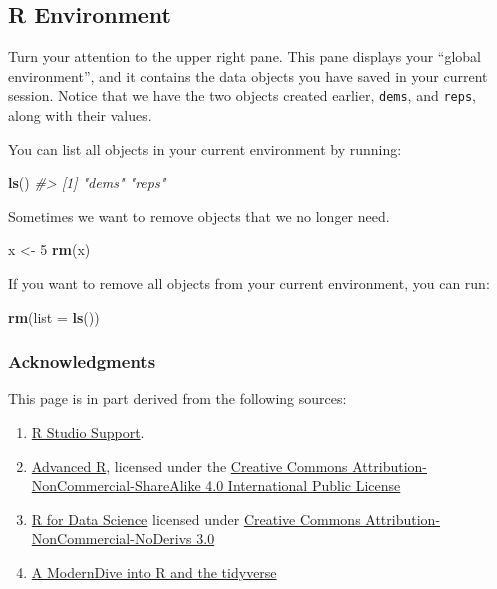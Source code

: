 \documentclass[]{book}
\newenvironment{Shaded}{\begin{snugshade}}{\end{snugshade}}
\newcommand{\KeywordTok}[1]{\textcolor[rgb]{0.13,0.29,0.53}{\textbf{#1}}}
\newcommand{\DataTypeTok}[1]{\textcolor[rgb]{0.13,0.29,0.53}{#1}}
\newcommand{\DecValTok}[1]{\textcolor[rgb]{0.00,0.00,0.81}{#1}}
\newcommand{\StringTok}[1]{\textcolor[rgb]{0.31,0.60,0.02}{#1}}
\newcommand{\CommentTok}[1]{\textcolor[rgb]{0.56,0.35,0.01}{\textit{#1}}}
\newcommand{\NormalTok}[1]{#1}
\begin{document}
\subsection{R Environment}\label{r-environment}

Turn your attention to the upper right pane. This pane displays your
``global environment'', and it contains the data objects you have saved
in your current session. Notice that we have the two objects created
earlier, \texttt{dems}, and \texttt{reps}, along with their values.

You can list all objects in your current environment by running:

\begin{Shaded}
\begin{Highlighting}[]
\KeywordTok{ls}\NormalTok{()}
\CommentTok{#> [1] "dems" "reps"}
\end{Highlighting}
\end{Shaded}

Sometimes we want to remove objects that we no longer need.

\begin{Shaded}
\begin{Highlighting}[]
\NormalTok{x <-}\StringTok{ }\DecValTok{5}
\KeywordTok{rm}\NormalTok{(x)}
\end{Highlighting}
\end{Shaded}

If you want to remove all objects from your current environment, you can
run:

\begin{Shaded}
\begin{Highlighting}[]
\KeywordTok{rm}\NormalTok{(}\DataTypeTok{list =} \KeywordTok{ls}\NormalTok{())}
\end{Highlighting}
\end{Shaded}

\subsubsection*{Acknowledgments}\label{acknowledgments}

This page is in part derived from the following sources:

\begin{enumerate}
\def\labelenumi{\arabic{enumi}.}
\item
  \href{https://support.rstudio.com/hc/en-us/articles/200484448}{R
  Studio Support}.
\item
  \href{https://adv-r.hadley.nz/}{Advanced R}, licensed under the
  \href{https://creativecommons.org/licenses/by-nc-sa/4.0/}{Creative
  Commons Attribution-NonCommercial-ShareAlike 4.0 International Public
  License}
\item
  \href{https://r4ds.had.co.nz}{R for Data Science} licensed under
  \href{https://creativecommons.org/licenses/by-nc-nd/3.0/us/}{Creative
  Commons Attribution-NonCommercial-NoDerivs 3.0}
\item
  \href{https://moderndive.netlify.com/1-getting-started.html}{A
  ModernDive into R and the tidyverse}
\end{enumerate}
\end{document}
